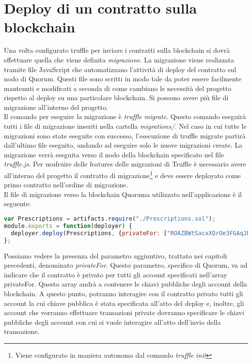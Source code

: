 \section{Deploy di un contratto sulla blockchain}
%
Una volta configurato truffle per inviare i contratti sulla blockchain si dovrà effettuare quella che viene definita \emph{migrazione}. La migrazione viene realizzata tramite file JavaScript che automatizzano l'attività di deploy del contratto sul nodo di Quorum. Questi file sono scritti in modo tale da poter essere facilmente mantenuti e modificati a seconda di come cambiano le necessità del progetto rispetto al deploy su una particolare blockchain. Si possono avere più file di migrazione all'interno del progetto. \\
Il comando per eseguire la migrazione è \emph{truffle migrate}. Questo comando eseguirà tutti i file di migrazione inseriti nella cartella \emph{migrations/}. Nel caso in cui tutte le migrazioni sono state eseguite con successo, l'esecuzione di truffle migrate partirà dall'ultimo file eseguito, andando ad eseguire solo le nuove migrazioni create. La migrazione verrà eseguita verso il nodo della blockchain specificato nel file \emph{truffle.js}. Per usufruire delle features delle migrazioni di Truffle è necessario avere all'interno del progetto il contratto di migrazione\footnote{Viene configurato in maniera autonoma dal comando \emph{truffle init}} e deve essere deployato come primo contratto nell'ordine di migrazione. \\
Il file di migrazione verso la blockchain Quoruma utilizzato nell'applicazione è il seguente:
\newline	
\begin{lstlisting}[language=javascript,caption={Script di migrazione del contratto dell'applicazione},captionpos=b,frame=lines,basicstyle=\linespread{0.9}\small]
var Prescriptions = artifacts.require("./Prescriptions.sol");
module.exports = function(deployer) {
  deployer.deploy(Prescriptions, {privateFor: ["ROAZBWtSacxXQrOe3FGAqJDyJjFePR5ce4TSIzmJ0Bc="]});
};
\end{lstlisting}
Possiamo vedere la presenza del parametro aggiuntivo, trattato nei capitoli precedenti, denominato \emph{privateFor}. Questo parametro, specifico di Quorum, va ad indicare che il contratto è privato per tutti gli account specificati nell'array privateFor. Questo array andrà a contenere le chiavi pubbliche degli account della blockchain. A questo punto, potranno interagire con il contratto privato tutti gli account la cui chiave pubblica è stata specificata all'atto del deploy e, inoltre, gli account che vorranno effettuare transazioni private dovranno specificare le chiavi pubbliche degli account con cui si vuole interagire all'atto dell'invio della transazione.\\
